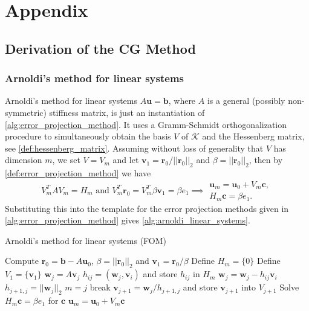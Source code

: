 \chapter*{Appendix}
\label{ch:appendix}
\section{Derivation of the CG Method}\label{sec:cg_derivation}

\subsection{Arnoldi's method for linear systems}\label{sec:arnoldi_linear_systems}
Arnoldi's method for linear systems $A\mathbf{u} = \mathbf{b}$, where $A$ is a general (possibly non-symmetric) stiffness matrix, is just an instantiation of \cref{alg:error_projection_method}. It uses a Gramm-Schmidt orthogonalization procedure to simultaneously obtain the basis $V$ of $\mathcal{K}$ and the Hessenberg matrix, see \cref{def:hessenberg_matrix}. Assuming without loss of generality that $V$ has dimension $m$, we set $V=V_m$ and let $\mathbf{v}_1 = \mathbf{r}_0/||\mathbf{r}_0||_2$ and $\beta = ||\mathbf{r}_0||_2$, then by \cref{def:error_projection_method} we have
\[
  V^T_mAV_m = H_m \text{ and } V^T_m\mathbf{r}_0 = V^T_m\beta \mathbf{v}_1 = \beta e_1 \implies
  \begin{array}{c}
    \mathbf{u}_m = \mathbf{u}_0 + V_m \mathbf{c}, \\
    H_m \mathbf{c} = \beta e_1.
  \end{array}
\]
Substituting this into the template for the error projection methods given in \cref{alg:error_projection_method} gives \cref{alg:arnoldi_linear_systems}.
\begin{algorithm}[H]
  \caption{Arnoldi's method for linear systems (FOM) \cite[Algorithm 6.4]{iter_method_saad}}
  \label{alg:arnoldi_linear_systems}
  \begin{algorithmic}
    \State Compute $\mathbf{r}_0 = \mathbf{b} - A\mathbf{u}_0$, $\beta = ||\mathbf{r}_0||_2$ and $\mathbf{v}_1 = \mathbf{r}_0 / \beta$
    \State Define $H_m = \{0\}$
    \State Define $V_1 = \{\mathbf{v}_1\}$
    \State $\mathbf{w}_j = A\mathbf{v}_j$
    \State $h_{ij} = (\mathbf{w}_j, \mathbf{v}_i)$ and store $h_{ij}$ in $H_m$
    \State $\mathbf{w}_j = \mathbf{w}_j - h_{ij}\mathbf{v}_i$
    \EndFor
    \State $h_{j+1,j} = ||\mathbf{w}_j||_2$
    \State $m = j$
    \State break
    \EndIf
    \State $\mathbf{v}_{j+1} = \mathbf{w}_j / h_{j+1,j}$ and store $\mathbf{v}_{j+1}$ into $V_{j+1}$
    \EndFor
    \State Solve $H_m \mathbf{c} = \beta e_1$ for $\mathbf{c}$
    \State $\mathbf{u}_m = \mathbf{u}_0 + V_m \mathbf{c}$
  \end{algorithmic}
\end{algorithm}


